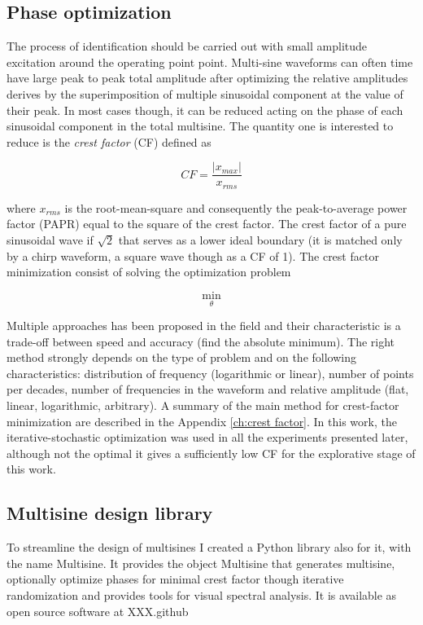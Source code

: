 \subsection{Phase optimization}
The process of identification should be carried out with small amplitude excitation around the operating point point. 
Multi-sine waveforms can often time have large peak to peak total amplitude after optimizing the relative amplitudes derives by the superimposition of multiple sinusoidal component at the value of their peak. 
In most cases though, it can be reduced acting on the phase of each sinusoidal component in the total multisine. 
The quantity one is interested to reduce is the \textit{crest factor} (CF) defined as

$$
CF = \frac{|x_{max}|}{x_{rms}}
$$

where $x_{rms}$ is the root-mean-square and consequently the peak-to-average power factor (PAPR) equal to the square of the crest factor. 
The crest factor of a pure sinusoidal wave if $\sqrt{2}$ that serves as a lower ideal boundary  (it is matched only by a chirp waveform, a square wave though as a CF of 1). 
The crest factor minimization consist of solving the optimization problem

$$
\min _\theta 
$$

Multiple approaches has been proposed in the field and their characteristic is a trade-off between speed and accuracy (find the absolute minimum). 
The right method strongly depends on the type of problem and on the following characteristics: distribution of frequency (logarithmic or linear), number of points per decades, number of frequencies in the waveform and relative amplitude (flat, linear, logarithmic, arbitrary). 
A summary of the main method for crest-factor minimization are described in the Appendix \ref{ch:crest factor}. 
In this work, the iterative-stochastic optimization was used in all the experiments presented later, although not the optimal it gives a sufficiently low CF for the explorative stage of this work.

\subsection{Multisine design library}

To streamline the design of multisines I created a Python library also for it, with the name Multisine. 
It provides the object Multisine that generates multisine, optionally optimize phases for minimal crest factor though iterative randomization and provides tools for visual spectral analysis. 
It is available as open source software at XXX.github

